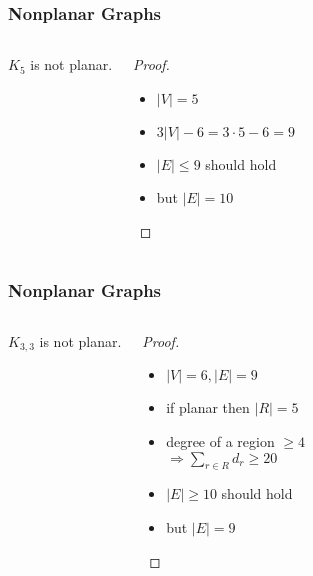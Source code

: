 \documentclass[dvipsnames]{beamer}
\begin{document}
\begin{frame}
  \frametitle{Nonplanar Graphs}

  \begin{columns}
    \begin{theorem}
      $K_5$ is not planar.

      \medskip
      \begin{center}
      \end{center}
    \end{theorem}

    \pause
    \begin{proof}
      \begin{itemize}
        \item $|V| = 5$

        \pause
        \item $3 |V| - 6 = 3 \cdot 5 - 6 = 9$

        \pause
        \item $|E| \leq 9$ should hold

        \pause
        \item but $|E| = 10$
      \end{itemize}
    \end{proof}
  \end{columns}
\end{frame}

\begin{frame}
  \frametitle{Nonplanar Graphs}

  \begin{columns}
    \begin{theorem}
      $K_{3,3}$ is not planar.

      \medskip
      \begin{center}
      \end{center}
    \end{theorem}

    \pause
    \begin{proof}
      \begin{itemize}
        \item $|V| = 6, |E| = 9$

        \pause
        \item if planar then $|R| = 5$

        \pause
        \item degree of a region $\geq 4$\\
          $\Rightarrow \sum_{r \in R} d_r \geq 20$

        \pause
        \item $|E| \geq 10$ should hold

        \pause
        \item but $|E| = 9$
      \end{itemize}
    \end{proof}
  \end{columns}
\end{frame}
\end{document}
